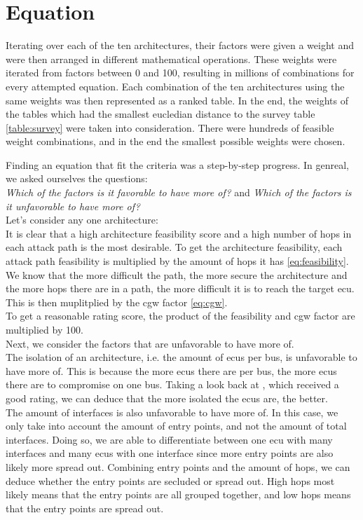 \section{Equation}
\label{sec:equation}

Iterating over each of the ten architectures, their factors were given a weight and were then arranged in different mathematical operations.
These weights were iterated from factors between 0 and 100, resulting in millions of combinations for every attempted equation.
Each combination of the ten architectures using the same weights was then represented as a ranked table. 
In the end, the weights of the tables which had the smallest eucledian distance to the survey table \ref{table:survey} were taken into consideration.
There were hundreds of feasible weight combinations, and in the end the smallest possible weights were chosen.

Finding an equation that fit the criteria was a step-by-step progress.
In genreal, we asked ourselves the questions:\\
\textit{Which of the factors is it favorable to have more of?} and \textit{Which of the factors is it unfavorable to have more of?}\\

Let's consider any one architecture:\\
It is clear that a high architecture feasibility score and a high number of hops in each attack path is the most desirable.
To get the architecture feasibility, each attack path feasibility is multiplied by the amount of hops it has \ref{eq:feasibility}.
We know that the more difficult the path, the more secure the architecture and the more hops there are in a path, the more difficult it is to reach the target \gls{ecu}.\\
This is then muplitplied by the \gls{cgw} factor \ref{eq:cgw}.\\
To get a reasonable rating score, the product of the feasibility and \gls{cgw} factor are multiplied by 100.\\

Next, we consider the factors that are unfavorable to have more of.\\
The isolation of an architecture, i.e. the amount of \gls{ecu}s per bus, is unfavorable to have more of.
This is because the more \gls{ecu}s there are per bus, the more \gls{ecu}s there are to compromise on one bus.
Taking a look back at , which received a good rating, we can deduce that the more isolated the \gls{ecu}s are, the better.\\
The amount of interfaces is also unfavorable to have more of.
In this case, we only take into account the amount of entry points, and not the amount of total interfaces.
Doing so, we are able to differentiate between one \gls{ecu} with many interfaces and many \gls{ecu}s with one interface since more entry points are also likely more spread out.
Combining entry points and the amount of hops, we can deduce whether the entry points are secluded or spread out.
High hops most likely means that the entry points are all grouped together, and low hops means that the entry points are spread out.\\

